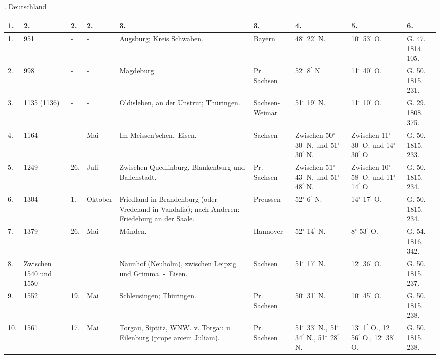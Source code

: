 \documentclass[a4paper, 11pt, oneside, polutonikogreek, german]{article}
\begin{document}
. Deutschland
\begin{table}[!ht]
    \centering
    \begin{tabular}{|l|l|l|l|l|l|l|l|l|}
    \hline
        1. & 2. & 2. & 2. & 3. & 3. & 4. & 5. & 6. \\ \hline
        1. & 951 & - & - & Augsburg; Kreis Schwaben. & Bayern & 48$^\circ$ 22$^\prime$ N. & 10$^\circ$ 53$^\prime$ O. & G. 47. 1814. 105. \\ \hline
        2. & 998 & - & - & Magdeburg. & Pr. Sachsen & 52$^\circ$ 8$^\prime$ N. & 11$^\circ$ 40$^\prime$ O. & G. 50. 1815. 231. \\ \hline
        3. & 1135 (1136) & - & - & Oldisleben, an der Unstrut; Thüringen. & Sachsen-Weimar & 51$^\circ$ 19$^\prime$ N. & 11$^\circ$ 10$^\prime$ O. & G. 29. 1808. 375. \\ \hline
        4. & 1164 & - & Mai & Im Meissen’schen. Eisen. & Sachsen & Zwischen 50$^\circ$ 30$^\prime$ N. und 51$^\circ$ 30$^\prime$ N. & Zwischen 11$^\circ$ 30$^\prime$ O. und 14$^\circ$ 30$^\prime$ O. & G. 50. 1815. 233. \\ \hline
        5. & 1249 & 26. & Juli & Zwischen Quedlinburg, Blankenburg und Ballenstadt. & Pr. Sachsen & Zwischen 51$^\circ$ 43$^\prime$ N. und 51$^\circ$ 48$^\prime$ N. & Zwischen 10$^\circ$ 58$^\prime$ O. und 11$^\circ$ 14$^\prime$ O. & G. 50. 1815. 234. \\ \hline
        6. & 1304 & 1. & Oktober & Friedland in Brandenburg (oder Vredeland in Vandalia); nach Anderen: Friedeburg an der Saale. & Preussen & 52$^\circ$ 6$^\prime$ N. & 14$^\circ$ 17$^\prime$ O. & G. 50. 1815. 234. \\ \hline
        7. & 1379 & 26. & Mai & Münden. & Hannover & 52$^\circ$ 14$^\prime$ N. & 8$^\circ$ 53$^\prime$ O. & G. 54. 1816. 342. \\ \hline
        8. & Zwischen 1540 und 1550 & ~ & ~ & Naunhof (Neuholm), zwischen Leipzig und Grimma. - Eisen. & Sachsen & 51$^\circ$ 17$^\prime$ N. & 12$^\circ$ 36$^\prime$ O. & G. 50. 1815. 237. \\ \hline
        9. & 1552 & 19. & Mai & Schleusingen; Thüringen. & Pr. Sachsen & 50$^\circ$ 31$^\prime$ N. & 10$^\circ$ 45$^\prime$ O. & G. 50. 1815. 238. \\ \hline
        10. & 1561 & 17. & Mai & Torgau, Siptitz, WNW. v. Torgau u. Eilenburg (prope arcem Juliam). & Pr. Sachsen & 51$^\circ$ 33$^\prime$ N., 51$^\circ$ 34$^\prime$ N., 51$^\circ$ 28$^\prime$ N. & 13$^\circ$ 1$^\prime$ O., 12$^\circ$ 56$^\prime$ O., 12$^\circ$ 38$^\prime$ O. & G. 50. 1815. 238. \\ \hline

\end{tabular}
\end{table}
\end{document}
